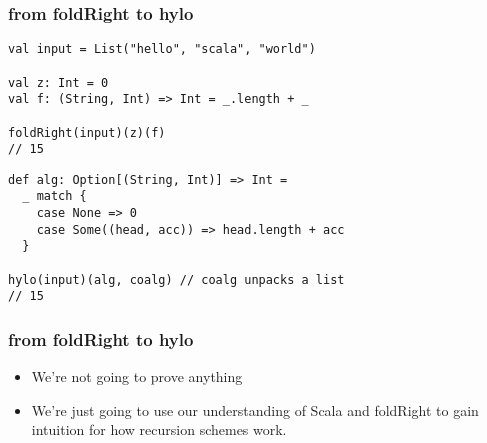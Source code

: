 \documentclass[include/preamble.tex]{subfiles}
\begin{document}
\begin{frame}[fragile]
  \frametitle{from foldRight to hylo}
  \begin{center}
    \begin{lstlisting}[style=scala]
val input = List("hello", "scala", "world")

val z: Int = 0
val f: (String, Int) => Int = _.length + _

foldRight(input)(z)(f)
// 15
    \end{lstlisting}
    \pause
    \hrulefill
    \begin{lstlisting}[style=scala]
def alg: Option[(String, Int)] => Int =
  _ match {
    case None => 0
    case Some((head, acc)) => head.length + acc
  }

hylo(input)(alg, coalg) // coalg unpacks a list
// 15
    \end{lstlisting}
  \end{center}
\end{frame}

\begin{frame}[fragile]
  \frametitle{from foldRight to hylo}
  \begin{center}
    \begin{itemize}
    \item
      We're not going to prove anything
    \item
      We're just going to use our understanding of Scala and
      foldRight to gain intuition for how recursion schemes work.
    \end{itemize}
  \end{center}
\end{frame}
\end{document}
